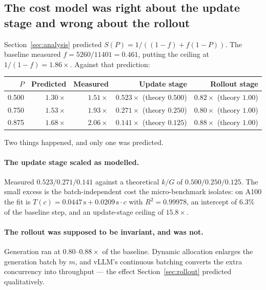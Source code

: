 \documentclass[11pt,a4paper]{article}
\begin{document}
\subsection{The cost model was right about the update stage and wrong about the
rollout}
\label{sec:results-model}

Section~\ref{sec:analysis} predicted $S(P) = 1/((1-f) + f(1-P))$. The baseline
measured $f = 5260/11401 = 0.461$, putting the ceiling at
$1/(1-f) = 1.86\times$. Against that prediction:

\begin{center}
\begin{tabular}{@{}rrrrr@{}}
\toprule
$P$ & Predicted & \textbf{Measured} & Update stage & Rollout stage \\
\midrule
0.500 & $1.30\times$ & $\mathbf{1.51\times}$ & $0.523\times$ (theory $0.500$) & $0.82\times$ (theory $1.00$) \\
0.750 & $1.53\times$ & $\mathbf{1.93\times}$ & $0.271\times$ (theory $0.250$) & $0.80\times$ (theory $1.00$) \\
0.875 & $1.68\times$ & $\mathbf{2.06\times}$ & $0.141\times$ (theory $0.125$) & $0.88\times$ (theory $1.00$) \\
\bottomrule
\end{tabular}
\end{center}

Two things happened, and only one was predicted.

\paragraph{The update stage scaled as modelled.} Measured $0.523 / 0.271 /
0.141$ against a theoretical $k/G$ of $0.500 / 0.250 / 0.125$. The small excess
is the batch-independent cost the micro-benchmark isolates: on A100 the fit is
$T(c) = 0.0447\,\mathrm{s} + 0.0209\,\mathrm{s} \cdot c$ with $R^2 = 0.99978$,
an intercept of $6.3\%$ of the baseline step, and an update-stage ceiling of
$15.8\times$.

\paragraph{The rollout was supposed to be invariant, and was not.} Generation
ran at $0.80$--$0.88\times$ of the baseline. Dynamic allocation enlarges the
generation batch by $m$, and vLLM's continuous batching converts the extra
concurrency into throughput --- the effect Section~\ref{sec:rollout} predicted
qualitatively.
\end{document}
